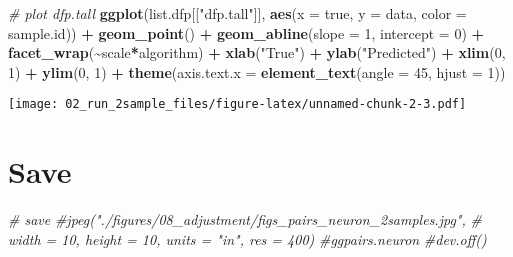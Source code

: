 \documentclass[
]{article}
\newenvironment{Shaded}{\begin{snugshade}}{\end{snugshade}}
\newcommand{\AttributeTok}[1]{\textcolor[rgb]{0.13,0.29,0.53}{#1}}
\newcommand{\CommentTok}[1]{\textcolor[rgb]{0.56,0.35,0.01}{\textit{#1}}}
\newcommand{\DecValTok}[1]{\textcolor[rgb]{0.00,0.00,0.81}{#1}}
\newcommand{\FunctionTok}[1]{\textcolor[rgb]{0.13,0.29,0.53}{\textbf{#1}}}
\newcommand{\NormalTok}[1]{#1}
\newcommand{\SpecialCharTok}[1]{\textcolor[rgb]{0.81,0.36,0.00}{\textbf{#1}}}
\newcommand{\StringTok}[1]{\textcolor[rgb]{0.31,0.60,0.02}{#1}}
\begin{document}
\begin{Shaded}
\begin{Highlighting}[]
\CommentTok{\# plot dfp.tall}
\FunctionTok{ggplot}\NormalTok{(list.dfp[[}\StringTok{"dfp.tall"}\NormalTok{]], }\FunctionTok{aes}\NormalTok{(}\AttributeTok{x =}\NormalTok{ true, }\AttributeTok{y =}\NormalTok{ data, }\AttributeTok{color =}\NormalTok{ sample.id)) }\SpecialCharTok{+} \FunctionTok{geom\_point}\NormalTok{() }\SpecialCharTok{+} 
  \FunctionTok{geom\_abline}\NormalTok{(}\AttributeTok{slope =} \DecValTok{1}\NormalTok{, }\AttributeTok{intercept =} \DecValTok{0}\NormalTok{) }\SpecialCharTok{+} \FunctionTok{facet\_wrap}\NormalTok{(}\SpecialCharTok{\textasciitilde{}}\NormalTok{scale}\SpecialCharTok{*}\NormalTok{algorithm) }\SpecialCharTok{+}
  \FunctionTok{xlab}\NormalTok{(}\StringTok{"True"}\NormalTok{) }\SpecialCharTok{+} \FunctionTok{ylab}\NormalTok{(}\StringTok{"Predicted"}\NormalTok{) }\SpecialCharTok{+} \FunctionTok{xlim}\NormalTok{(}\DecValTok{0}\NormalTok{, }\DecValTok{1}\NormalTok{) }\SpecialCharTok{+} \FunctionTok{ylim}\NormalTok{(}\DecValTok{0}\NormalTok{, }\DecValTok{1}\NormalTok{) }\SpecialCharTok{+}
  \FunctionTok{theme}\NormalTok{(}\AttributeTok{axis.text.x =} \FunctionTok{element\_text}\NormalTok{(}\AttributeTok{angle =} \DecValTok{45}\NormalTok{, }\AttributeTok{hjust =} \DecValTok{1}\NormalTok{))}
\end{Highlighting}
\end{Shaded}

\texttt{[image: 02\_run\_2sample\_files/figure-latex/unnamed-chunk-2-3.pdf]}

\hypertarget{save}{%
\section{Save}\label{save}}

\begin{Shaded}
\begin{Highlighting}[]
\CommentTok{\# save}
\CommentTok{\#jpeg("./figures/08\_adjustment/figs\_pairs\_neuron\_2samples.jpg", }
\CommentTok{\#     width = 10, height = 10, units = "in", res = 400)}
\CommentTok{\#ggpairs.neuron}
\CommentTok{\#dev.off()}
\end{Highlighting}
\end{Shaded}
\end{document}
